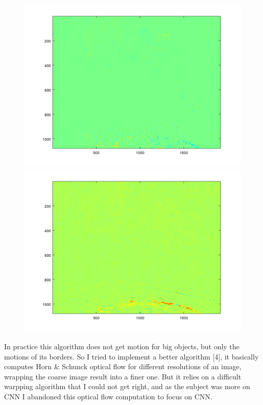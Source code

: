 \documentclass[10pt,a4paper]{report}
\begin{document}
		\begin{figure}[h]
			\begin{minipage}[b]{.49\linewidth}
				\includegraphics[width=1.0\textwidth]{ofx.png}
			\end{minipage}
			\hfill
			\begin{minipage}[b]{0.49\linewidth}
				\includegraphics[width=1.0\textwidth]{ofy.png}
			\end{minipage}
			\label{fig:f}
		\end{figure}
		
		In practice this algorithm does not get motion for big objects, but only the motions of its borders. So I tried to implement a better algorithm [4], it basically computes Horn \& Schunck optical flow for different resolutions of an image, wrapping the coarse image result into a finer one. But it relies on a difficult warpping algorithm that I could not get right, and as the subject was more on CNN I abandoned this optical flow computation to focus on CNN.
		
\end{document}
